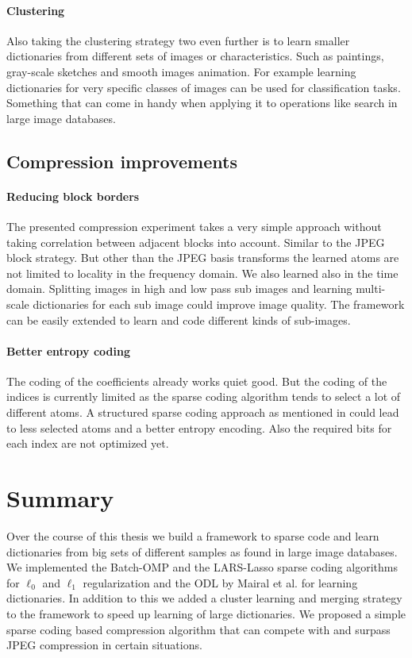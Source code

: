 \paragraph{Clustering}
Also taking the clustering strategy two even further is to learn smaller
dictionaries from different sets of images or characteristics. Such as
paintings, gray-scale sketches and smooth images animation. For example learning
dictionaries for very specific classes of images can be used for classification
tasks. Something that can come in handy when applying it to operations like
search in large image databases.


\subsection{Compression improvements}
\paragraph{Reducing block borders} The presented compression experiment
takes a very simple approach without taking correlation between adjacent
blocks into account. Similar to the JPEG block strategy. But other than
the JPEG basis transforms the learned atoms are not limited to locality in the
frequency domain. We also learned also in the time domain. 
Splitting images in high and low pass sub images and learning multi-scale
dictionaries for each sub image could improve image quality. The framework can
be easily extended to learn and code different kinds of sub-images.

\paragraph{Better entropy coding}
The coding of the coefficients already works quiet good. But the coding of the
indices is currently limited as the sparse coding algorithm tends to select a
lot of different atoms. A structured sparse coding approach as mentioned in
 could lead to less selected atoms and a better
entropy encoding. Also the required bits for each index are not optimized yet.


\section{Summary}
Over the course of this thesis we build a framework to sparse code and learn
dictionaries from big sets of different samples as found in large image
databases. We implemented the Batch-OMP and the LARS-Lasso sparse coding
algorithms for $\ell_0$ and $\ell_1$ regularization and the ODL by Mairal et
al. for learning dictionaries. 
In addition to this we added a cluster learning and merging strategy to the
framework to speed up learning of large dictionaries.
We proposed a simple sparse coding based compression algorithm that can compete
with and surpass JPEG compression in certain situations.









